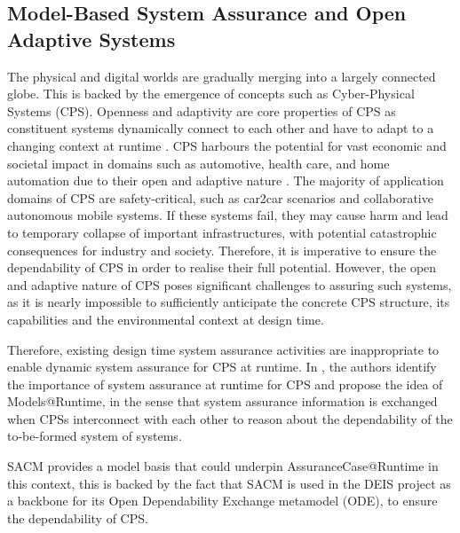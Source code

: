 \subsection{Model-Based System Assurance and Open Adaptive  Systems}

The physical and digital worlds are gradually merging into a largely connected globe. 
This is backed by the emergence of concepts such as Cyber-Physical Systems (CPS).
Openness and adaptivity are core properties of CPS as constituent systems dynamically connect to each other and have to adapt to a changing context at runtime \cite{trapp2013safety}.
CPS harbours the potential for vast economic and societal impact in domains such as automotive, health care, and home automation due to their open and adaptive nature \cite{wei2017deis}.
The majority of application domains of CPS are safety-critical, such as car2car scenarios and collaborative autonomous mobile systems.
If these systems fail, they may cause harm and lead to temporary collapse of important infrastructures, with potential catastrophic consequences for industry and society.
Therefore, it is imperative to ensure the dependability of CPS in order to realise their full potential. 
However, the open and adaptive nature of CPS poses significant challenges to assuring such systems, as it is nearly impossible to sufficiently anticipate the concrete CPS structure, its capabilities and the environmental context at design time.

Therefore, existing design time system assurance activities are inappropriate to enable dynamic system assurance for CPS at runtime. 
In \cite{trapp2013safety}, the authors identify the importance of system assurance at runtime for CPS and propose the idea of Models@Runtime, in the sense that system assurance information is exchanged when CPSs interconnect with each other to reason about the dependability of the to-be-formed system of systems.

SACM provides a model basis that could underpin AssuranceCase@Runtime in this context, this is backed by the fact that SACM is used in the DEIS project \cite{wei2017deis} as a backbone for its Open Dependability Exchange metamodel (ODE), to ensure the dependability of CPS. 




